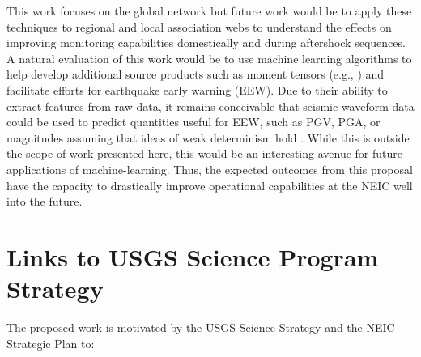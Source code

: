 \documentclass[12p]{article}
\begin{document}
This work focuses on the global network but future work would be to apply these techniques to regional and local association webs to understand the effects on improving monitoring capabilities domestically and during aftershock sequences. A natural evaluation of this work would be to use machine learning algorithms to help develop additional source products such as moment tensors (e.g., \citet{Ross2018a}) and facilitate efforts for earthquake early warning (EEW). Due to their ability to extract features from raw data, it remains conceivable that seismic waveform data could be used to predict quantities useful for EEW, such as PGV, PGA, or magnitudes assuming that ideas of weak determinism hold \citep{Goldberg2018}. While this is outside the scope of work presented here, this would be an interesting avenue for future applications of machine-learning. Thus, the expected outcomes from this proposal have the capacity to drastically improve operational capabilities at the NEIC well into the future.

\section*{Links to USGS Science Program Strategy}
The proposed work is motivated by the USGS Science Strategy \citep{Holmes2013} and the NEIC Strategic Plan \citep{Hayes2019sp} to:
\end{document}
